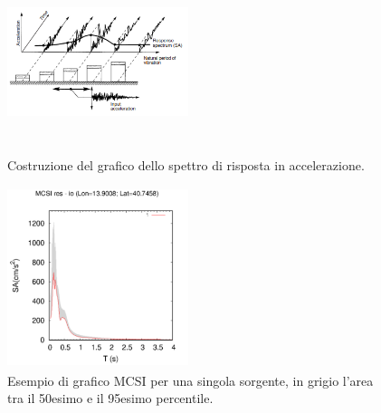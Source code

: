 \documentclass[a4paper,12pt,titlepage]{article}
\begin{document}
\begin{figure}[htbp]%
 \centering
 \includegraphics[width = 150pt, height =150pt]{Img/oscillatori.png}
 \caption{Costruzione del grafico dello spettro di risposta in accelerazione.}
 \label{fig:oscillatori}
\end{figure}

\begin{figure}[htbp]%
 \centering
 \includegraphics[width = 150pt, height =150pt]{Img/MCSI.png}
 \caption{Esempio di grafico MCSI per una singola sorgente, in grigio l'area tra il 50esimo e il 95esimo percentile.}
 \label{fig:MCSI}
\end{figure}
\clearpage
\end{document}
